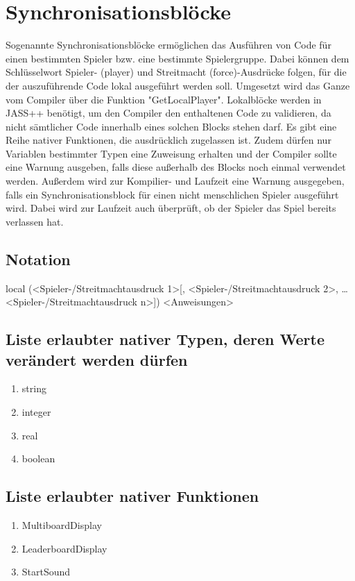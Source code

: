 \chapter{Synchronisationsblöcke}
Sogenannte Synchronisationsblöcke ermöglichen das Ausführen von Code für einen bestimmten Spieler bzw. eine bestimmte Spielergruppe.
Dabei können dem Schlüsselwort Spieler- (player) und Streitmacht (force)-Ausdrücke folgen, für die der auszuführende Code lokal ausgeführt werden soll.
Umgesetzt wird das Ganze vom Compiler über die Funktion "GetLocalPlayer". Lokalblöcke werden in JASS++ benötigt, um den Compiler den enthaltenen Code zu validieren, da nicht sämtlicher Code innerhalb eines solchen Blocks stehen darf.
Es gibt eine Reihe nativer Funktionen, die ausdrücklich zugelassen ist.
Zudem dürfen nur Variablen bestimmter Typen eine Zuweisung erhalten und der Compiler sollte eine Warnung ausgeben, falls diese außerhalb des Blocks noch einmal verwendet werden.
Außerdem wird zur Kompilier- und Laufzeit eine Warnung ausgegeben, falls ein Synchronisationsblock für einen nicht menschlichen Spieler ausgeführt wird.
Dabei wird zur Laufzeit auch überprüft, ob der Spieler das Spiel bereits verlassen hat.

\section{Notation}
local (<Spieler-/Streitmachtausdruck 1>[, <Spieler-/Streitmachtausdruck 2>, … <Spieler-/Streitmachtausdruck n>])
	<Anweisungen>

\section{Liste erlaubter nativer Typen, deren Werte verändert werden dürfen}
\begin{enumerate}
\item string
\item integer
\item real
\item boolean
\end{enumerate}

\section{Liste erlaubter nativer Funktionen}
\begin{enumerate}
\item MultiboardDisplay
\item LeaderboardDisplay
\item StartSound
\end{enumerate}
